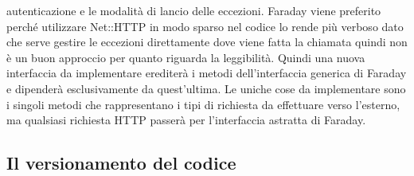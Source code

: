 \documentclass[target=bach,aauheader=,style=]{thud}
\begin{document}
autenticazione e le modalità di lancio delle eccezioni. Faraday viene preferito perché utilizzare Net::HTTP in modo sparso nel codice lo rende più verboso dato che serve gestire le eccezioni
direttamente dove viene fatta la chiamata quindi non è un buon approccio per quanto riguarda la leggibilità. Quindi una nuova interfaccia da implementare erediterà i metodi dell'interfaccia generica
di Faraday e dipenderà esclusivamente da quest'ultima. Le uniche cose da implementare sono i singoli metodi che rappresentano i tipi di richiesta da effettuare verso l'esterno, ma qualsiasi richiesta
HTTP passerà per l'interfaccia astratta di Faraday.

\subsection{Il versionamento del codice}
\end{document}
